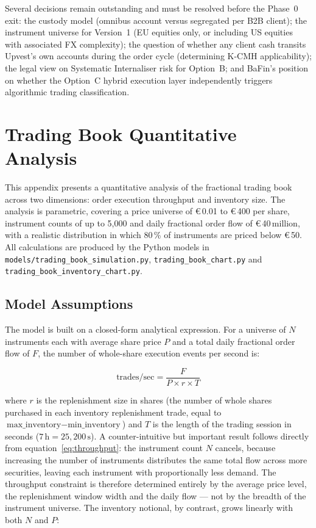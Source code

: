 \documentclass[12pt,a4paper]{report}
\newcommand{\eur}{\euro\,}
\begin{document}
Several decisions remain outstanding and must be resolved before the Phase~0 exit:
the custody model (omnibus account versus segregated per B2B client); the instrument
universe for Version~1 (EU equities only, or including US equities with associated FX
complexity); the question of whether any client cash transits Upvest's own accounts
during the order cycle (determining K-CMH applicability); the legal view on
Systematic Internaliser risk for Option~B; and BaFin's position on whether the
Option~C hybrid execution layer independently triggers algorithmic trading classification.

\appendix
\chapter{Trading Book Quantitative Analysis}
\label{app:tradingbook}

This appendix presents a quantitative analysis of the fractional trading book
across two dimensions: order execution throughput and inventory size. The
analysis is parametric, covering a price universe of \eur{}0.01 to \eur{}400 per share,
instrument counts of up to 5{,}000 and daily fractional order flow of
\eur{}40\,million, with a realistic distribution in which 80\,\% of instruments
are priced below \eur{}50. All calculations are produced by the Python models
in \texttt{models/trading\_book\_simulation.py},
\texttt{trading\_book\_chart.py} and
\texttt{trading\_book\_inventory\_chart.py}.

\section{Model Assumptions}

The model is built on a closed-form analytical expression. For a universe of
$N$ instruments each with average share price $P$ and a total daily fractional
order flow of $F$, the number of whole-share execution events per second is:

\begin{equation}
  \text{trades/sec} = \frac{F}{P \times r \times T}
  \label{eq:throughput}
\end{equation}

where $r$ is the replenishment size in shares (the number of whole shares
purchased in each inventory replenishment trade, equal to
$\text{max\_inventory} - \text{min\_inventory}$) and $T$ is the length of the
trading session in seconds ($7\,\text{h} = 25{,}200\,\text{s}$). A
counter-intuitive but important result follows directly from
equation~\eqref{eq:throughput}: the instrument count $N$ cancels, because
increasing the number of instruments distributes the same total flow across
more securities, leaving each instrument with proportionally less demand. The
throughput constraint is therefore determined entirely by the average price
level, the replenishment window width and the daily flow --- not by the breadth
of the instrument universe. The inventory notional, by contrast, grows linearly
with both $N$ and $P$:
\end{document}
